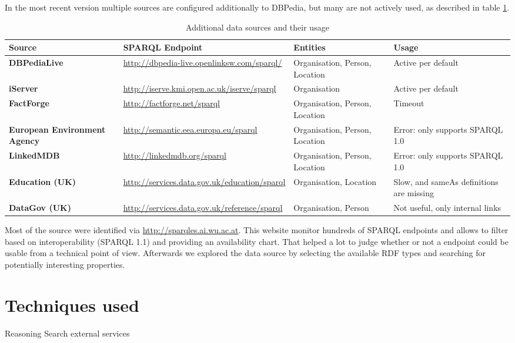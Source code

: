\documentclass[11pt,titlepage,oneside,openany]{article}
\begin{document}
In the most recent version multiple sources are configured additionally to DBPedia, but many are not actively used, as described in table \ref{tab:sources}.
\begin{table}[ht]
	\begin{tabular*}{\textwidth}{p{}|p{}|p{} |p{3cm}}
		
		\textbf{Source} &\small \textbf{SPARQL Endpoint} & \textbf{Entities} & \textbf{Usage}  \\
		\hline 
		\textbf{DBPediaLive} &\small \url{http://dbpedia-live.openlinksw.com/sparql/} & Organisation, Person, Location  & Active per default\\
		\hline 
		\textbf{iServer} &\small \url{http://iserve.kmi.open.ac.uk/iserve/sparql} & Organisation & Active per default \\
		\hline 
		\textbf{FactForge} &\small \url{http://factforge.net/sparql} & Organisation, Person, Location & Timeout \\
		\hline 
		\textbf{European Environment Agency} &\small \url{http://semantic.eea.europa.eu/sparql} &  Organisation, Person, Location  & Error: only supports SPARQL 1.0  \\
		\hline   
		\textbf{LinkedMDB} &\small \url{http://linkedmdb.org/sparql} &  Organisation, Person, Location  & Error: only supports SPARQL 1.0 \\
		\hline 
		\textbf{Education (UK)} & \small \url{http://services.data.gov.uk/education/sparql} &  Organisation, Location  & Slow, and sameAs definitions are missing \\
		\hline 
		\textbf{DataGov (UK)} &\small \url{http://services.data.gov.uk/reference/sparql} &  Organisation, Person  & Not useful, only internal links\\
	\end{tabular*}
	\caption{Additional data sources and their usage}
	\label{tab:sources}
\end{table}

Most of the source were identified via \url{http://sparqles.ai.wu.ac.at}. This website monitor hundreds of SPARQL endpoints and allows to filter based on interoperability (SPARQL 1.1) and providing an availability chart. That helped a lot to judge whether or not a endpoint could be usable from a technical point of view. Afterwards we explored the data source by selecting the available RDF types and searching for potentially interesting properties. 



\section{Techniques used} 
Reasoning
Search
external services
\end{document}
